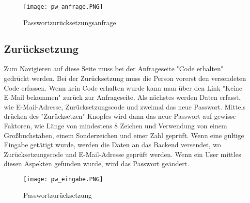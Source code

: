 \begin{center}
\begin{figure}[h]
    \centering
    \texttt{[image: pw\_anfrage.PNG]}
    \caption{Passwortzurücksetzungsanfrage}
\end{figure}
\end{center}
\newpage

\subsection{Zurücksetzung}
Zum Navigieren auf diese Seite muss bei der Anfrageseite "Code erhalten" gedrückt werden. Bei der Zurücksetzung muss die Person vorerst den versendeten Code erfassen. Wenn kein Code erhalten wurde kann man über den Link "Keine E-Mail bekommen" zurück zur Anfrageseite. Als nächstes werden Daten erfasst, wie E-Mail-Adresse, Zurücksetzungscode und zweimal das neue Passwort.
Mittels drücken des "Zurücksetzen" Knopfes wird dann das neue Passwort auf gewisse Faktoren, wie Länge von mindestens 8 Zeichen und Verwendung von einem Großbuchstaben, einem Sonderzeichen und einer Zahl geprüft.
Wenn eine gültige Eingabe getätigt wurde, werden die Daten an das Backend versendet, wo Zurücksetzungscode und E-Mail-Adresse geprüft werden. Wenn ein User mittles diesen Aspekten gefunden wurde, wird das Passwort geändert.

\begin{center}
\begin{figure}[h]
	\centering
	\texttt{[image: pw\_eingabe.PNG]}
	\caption{Passwortzurücksetzung}
\end{figure}
\end{center}